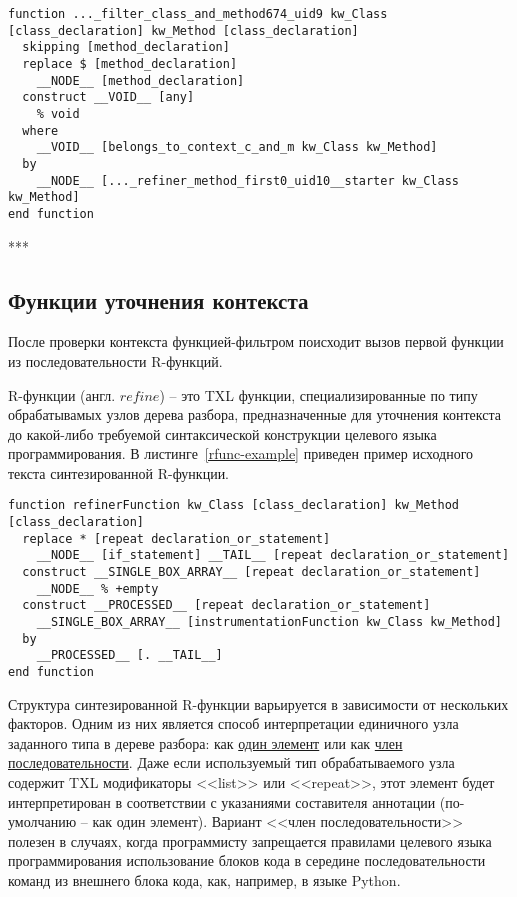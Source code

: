 \begin{lstlisting}[language=TXL, label={ffunc-example}, caption={Пример синтезированной F-функции.}]
function ..._filter_class_and_method674_uid9 kw_Class [class_declaration] kw_Method [class_declaration]
  skipping [method_declaration]
  replace $ [method_declaration]
    __NODE__ [method_declaration]
  construct __VOID__ [any]
    % void
  where
    __VOID__ [belongs_to_context_c_and_m kw_Class kw_Method]
  by
    __NODE__ [..._refiner_method_first0_uid10__starter kw_Class kw_Method]
end function
\end{lstlisting}

***

\subsection{Функции уточнения контекста}

После проверки контекста функцией-фильтром поисходит вызов первой функции из последовательности R-функций.

R-функции (англ. $refine$) -- это TXL функции, специализированные по типу обрабатывамых узлов дерева разбора, предназначенные для уточнения контекста до какой-либо требуемой синтаксической конструкции целевого языка программирования.
В листинге~\ref{rfunc-example} приведен пример исходного текста синтезированной R-функции.

\begin{lstlisting}[frame=single, language=TXL, label={rfunc-example}, caption={Пример синтезированной R-функции.}]
function refinerFunction kw_Class [class_declaration] kw_Method [class_declaration]
  replace * [repeat declaration_or_statement]
    __NODE__ [if_statement] __TAIL__ [repeat declaration_or_statement]
  construct __SINGLE_BOX_ARRAY__ [repeat declaration_or_statement]
    __NODE__ % +empty
  construct __PROCESSED__ [repeat declaration_or_statement]
    __SINGLE_BOX_ARRAY__ [instrumentationFunction kw_Class kw_Method]
  by
    __PROCESSED__ [. __TAIL__]
end function
\end{lstlisting}

Структура синтезированной R-функции варьируется в зависимости от нескольких факторов.
Одним из них является способ интерпретации единичного узла заданного типа в дереве разбора: как \underline{один элемент} или как \underline{член последовательности}.
Даже если используемый тип обрабатываемого узла содержит TXL модификаторы <<list>> или <<repeat>>, этот элемент будет интерпретирован в соответствии с указаниями составителя аннотации (по-умолчанию -- как один элемент).
Вариант <<член последовательности>> полезен в случаях, когда программисту запрещается правилами целевого языка программирования использование блоков кода в середине последовательности команд из внешнего блока кода, как, например, в языке Python.

